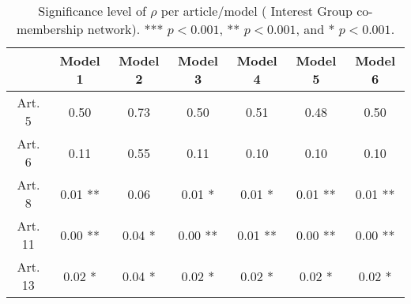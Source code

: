 \begin{table}[ht]
\centering
\begin{tabular}{ccccccc}
  \toprule
 & Model 1 & Model 2 & Model 3 & Model 4 & Model 5 & Model 6 \\ 
  \midrule
Art. 5 & 0.50   & 0.73   & 0.50   & 0.51   & 0.48   & 0.50   \\ 
   \midrule
Art. 6 & 0.11   & 0.55   & 0.11   & 0.10   & 0.10   & 0.10   \\ 
   \midrule
Art. 8 & 0.01 ** & 0.06   & 0.01 * & 0.01 * & 0.01 ** & 0.01 ** \\ 
   \midrule
Art. 11 & 0.00 ** & 0.04 * & 0.00 ** & 0.01 ** & 0.00 ** & 0.00 ** \\ 
   \midrule
Art. 13 & 0.02 * & 0.04 * & 0.02 * & 0.02 * & 0.02 * & 0.02 * \\ 
   \bottomrule
\end{tabular}
\caption{Significance level of $\rho$ per article/model ( Interest Group co-membership network). *** $p < 0.001$, ** $p < 0.001$, and * $p < 0.001$.} 
\end{table}
